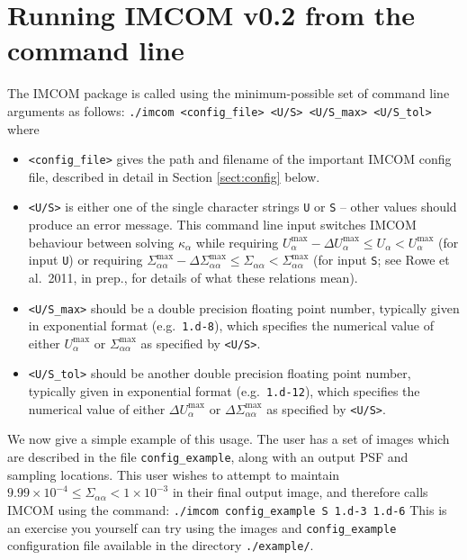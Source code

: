 \documentclass[10pt]{article}
\begin{document}
\section{Running IMCOM v0.2 from the command line}
The IMCOM package is called using the minimum-possible set of command line arguments as follows:
\newline
\newline
\indent \texttt{./imcom <config\_file> <U/S> <U/S\_max> <U/S\_tol>}
\newline
\newline
where
\begin{itemize}
\item \texttt{<config\_file>} gives the path and filename of the important IMCOM config file, described in detail in Section \ref{sect:config} below.

\item \texttt{<U/S>} is either one of the single character strings \texttt{U} or \texttt{S} -- other values should produce an error message.  This command line input switches IMCOM behaviour between solving $\kappa_{\alpha}$ while requiring $U_{\alpha}^{\textrm{max}} - \Delta U_{\alpha}^{\textrm{max}} \le U_{\alpha} < U_{\alpha}^{\textrm{max}}$ (for input \texttt{U}) or requiring $ \Sigma_{\alpha \alpha}^{\textrm{max}} - \Delta \Sigma_{\alpha \alpha}^{\textrm{max}} \le \Sigma_{\alpha \alpha} < \Sigma_{\alpha \alpha}^{\textrm{max}}$ (for input \texttt{S}; see Rowe et al.\ 2011, in prep., for details of what these relations mean).

\item \texttt{<U/S\_max>} should be a double precision floating point number, typically given in exponential format (e.g.\ \texttt{1.d-8}), which specifies the numerical value of either $U_{\alpha}^{\textrm{max}}$ or $\Sigma_{\alpha \alpha}^{\textrm{max}}$ as specified by \texttt{<U/S>}.

\item \texttt{<U/S\_tol>} should be another double precision floating point number, typically given in exponential format (e.g.\ \texttt{1.d-12}), which specifies the numerical value of either $\Delta U_{\alpha}^{\textrm{max}}$ or $\Delta \Sigma_{\alpha \alpha}^{\textrm{max}}$ as specified by \texttt{<U/S>}.
\end{itemize}

We now give a simple example of this usage. The user has a set of images which are described in the file \texttt{config\_example}, along with an output PSF and sampling locations.  This user wishes to attempt to maintain $9.99 \times 10^{-4} \le \Sigma_{\alpha \alpha} < 1 \times 10^{-3}$ in their final output image, and therefore calls IMCOM using the command:
\newline
\newline
\texttt{./imcom config\_example S 1.d-3 1.d-6}
\newline
\newline
This is an exercise you yourself can try using the images and \texttt{config\_example} configuration file available in the directory \texttt{./example/}.
\end{document}
